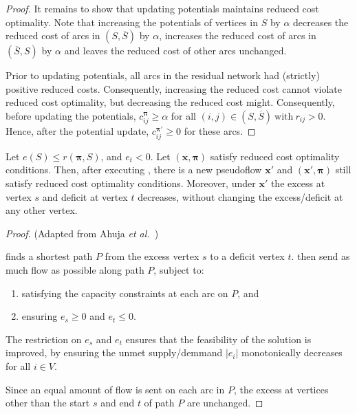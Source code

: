 \begin{proof}
    It remains to show that updating potentials maintains reduced cost optimality. Note that increasing the potentials of vertices in $S$ by $\alpha$ decreases the reduced cost of arcs in $\left(S,\overline{S}\right)$ by $\alpha$, increases the reduced cost of arcs in $\left(\overline{S},S\right)$ by $\alpha$ and leaves the reduced cost of other arcs unchanged.
    
    Prior to updating potentials, all arcs in the residual network had (strictly) positive reduced costs. Consequently, increasing the reduced cost cannot violate reduced cost optimality\footnotemark, but decreasing the reduced cost might. Consequently, before updating the potentials, $c_{ij}^{\boldsymbol{\pi}} \geq \alpha$ for all $(i,j)\in\left(S,\overline{S}\right)\:\mbox{with}\:r_{ij}>0$. Hence, after the potential update, $c_{ij}^{\boldsymbol{\pi}'}\geq 0$ for these arcs.
\end{proof}

\begin{lemma} \label{lemma:relax-correctness-augmentflow}
    Let $e(S) \leq r(\boldsymbol{\pi},S)$, and $e_t < 0$. Let $\left(\mathbf{x},\boldsymbol{\pi}\right)$ satisfy reduced cost optimality conditions. Then, after executing , there is a new pseudoflow $\mathbf{x}'$ and $\left(\mathbf{x}',\boldsymbol{\pi}\right)$ still satisfy reduced cost optimality conditions. Moreover, under $\mathbf{x}'$ the excess at vertex $s$ and deficit at vertex $t$ decreases, without changing the excess/deficit at any other vertex.
\end{lemma}
\begin{proof} (Adapted from Ahuja \textit{et al.}~\cite[p.~336]{Ahuja:1993})
    
     finds a shortest path $P$ from the excess vertex $s$ to a deficit vertex $t$.  then send as much flow as possible along path $P$, subject to:
    \begin{enumerate}
        \item satisfying the capacity constraints at each arc on $P$, and
        \item ensuring $e_s \geq 0$ and $e_t \leq 0$.
    \end{enumerate}
    The restriction on $e_s$ and $e_t$ ensures that the feasibility of the solution is improved, by ensuring the unmet supply/demmand $|e_i|$ monotonically decreases for all $i \in V$\footnotemark.
    
    Since an equal amount of flow is sent on each arc in $P$, the excess at vertices other than the start $s$ and end $t$ of path $P$ are unchanged.
\end{proof}


